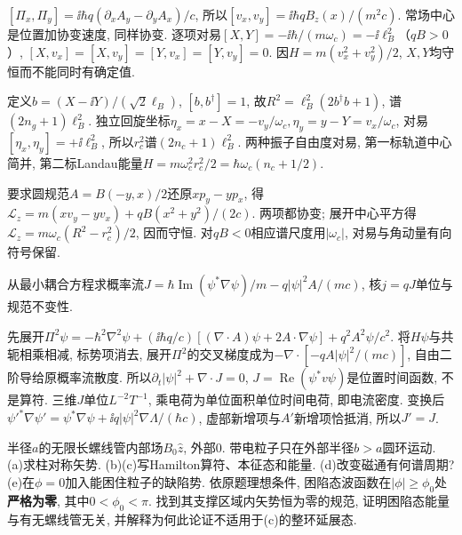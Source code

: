 \begin{solution}
$[\Pi_x,\Pi_y]=\ii\hbar q(\partial_xA_y-\partial_yA_x)/c$, 所以$[v_x,v_y]=\ii\hbar qB_z(x)/(m^2c)$. 常场中心是位置加协变速度, 同样协变. 逐项对易$[X,Y]=-\ii\hbar/(m\omega_c)=-\ii\ell_B^2$（$qB>0$）, $[X,v_x]=[X,v_y]=[Y,v_x]=[Y,v_y]=0$. 因$H=m(v_x^2+v_y^2)/2$, $X,Y$均守恒而不能同时有确定值.

定义$b=(X-\ii Y)/(\sqrt2\ell_B)$, $[b,b^\dagger]=1$, 故$R^2=\ell_B^2(2b^\dagger b+1)$, 谱$(2n_g+1)\ell_B^2$. 独立回旋坐标$\eta_x=x-X=-v_y/\omega_c,\eta_y=y-Y=v_x/\omega_c$, 对易$[\eta_x,\eta_y]=+\ii\ell_B^2$, 所以$r_c^2$谱$(2n_c+1)\ell_B^2$. 两种振子自由度对易, 第一标轨道中心简并, 第二标Landau能量$H=m\omega_c^2r_c^2/2=\hbar\omega_c(n_c+1/2)$.

要求圆规范$A=B(-y,x)/2$还原$x p_y-y p_x$, 得$\mathcal L_z=m(xv_y-yv_x)+qB(x^2+y^2)/(2c)$. 两项都协变; 展开中心平方得$\mathcal L_z=m\omega_c(R^2-r_c^2)/2$, 因而守恒. 对$qB<0$相应谱尺度用$|\omega_c|$, 对易与角动量有向符号保留.
\end{solution}
\begin{exercise}
从最小耦合方程求概率流$J=\hbar\operatorname{Im}(\psi^*\nabla\psi)/m-q|\psi|^2A/(mc)$, 核$j=qJ$单位与规范不变性.
\end{exercise}
\begin{solution}
先展开$\Pi^2\psi=-\hbar^2\nabla^2\psi+(\ii\hbar q/c)[(\nabla\cdot A)\psi+2A\cdot\nabla\psi]+q^2A^2\psi/c^2$. 将$H\psi$与共轭相乘相减, 标势项消去, 展开$\Pi^2$的交叉梯度成为$-\nabla\cdot[-qA|\psi|^2/(mc)]$, 自由二阶导给原概率流散度. 所以$\partial_t|\psi|^2+\nabla\cdot J=0$, $J=\operatorname{Re}(\psi^*v\psi)$是位置时间函数, 不是算符. 三维$J$单位$L^{-2}T^{-1}$, 乘电荷为单位面积单位时间电荷, 即电流密度. 变换后$\psi'^*\nabla\psi'=\psi^*\nabla\psi+\ii q|\psi|^2\nabla\Lambda/(\hbar c)$, 虚部新增项与$A'$新增项恰抵消, 所以$J'=J$.
\end{solution}
\begin{exercise}
半径$a$的无限长螺线管内部场$B_0\hat z$, 外部0. 带电粒子只在外部半径$b>a$圆环运动. (a)求柱对称矢势. (b)(c)写Hamilton算符、本征态和能量. (d)改变磁通有何谱周期? (e)在$\phi=0$加入能困住粒子的缺陷势. 依原题理想条件, 困陷态波函数在$|\phi|\ge\phi_0$处\textbf{严格为零}, 其中$0<\phi_0<\pi$. 找到其支撑区域内矢势恒为零的规范, 证明困陷态能量与有无螺线管无关, 并解释为何此论证不适用于(c)的整环延展态.
\end{exercise}
